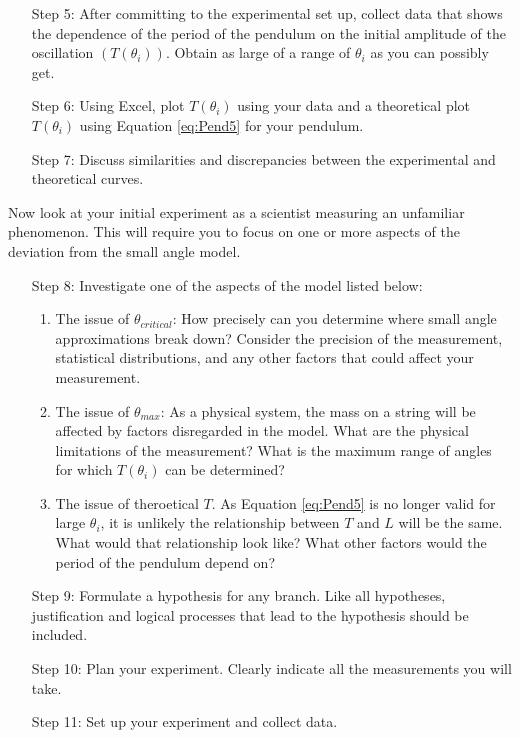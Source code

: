 \documentclass[12pt, a4paper, oneside, openright, titlepage]{book}
\begin{document}
\begin{itemize}[leftmargin = 50pt]
    \item[Step 5:] After committing to the experimental set up, collect data that shows the dependence of the period of the pendulum on the initial amplitude of the oscillation $(T(\theta_i))$. Obtain as large of a range of $\theta_i$ as you can possibly get.
    \item[Step 6:] Using Excel, plot $T(\theta_i)$ using your data and a theoretical plot $T(\theta_i)$ using Equation \ref{eq:Pend5} for your pendulum.
    \item[Step 7:] Discuss similarities and discrepancies between the experimental and theoretical curves.
\end{itemize}

Now look at your initial experiment as a scientist measuring an unfamiliar phenomenon. This will require you to focus on one or more aspects of the deviation from the small angle model. 


\begin{itemize}[leftmargin = 50pt]
    \item[Step 8:] Investigate one of the aspects of the model listed below: \begin{enumerate}
            \item The issue of $\theta_{critical}$: How precisely can you determine where small angle approximations break down? Consider the precision of the measurement, statistical distributions, and any other factors that could affect your measurement.
            \item The issue of $\theta_{max}$: As a physical system, the mass on a string will be affected by factors disregarded in the model. What are the physical limitations of the measurement? What is the maximum range of angles for which $T(\theta_i)$ can be determined?
            \item The issue of theroetical $T$. As Equation \ref{eq:Pend5} is no longer valid for large $\theta_i$, it is unlikely the relationship between $T$ and $L$ will be the same. What would that relationship look like? What other factors would the period of the pendulum depend on?
    \end{enumerate}
    \item[Step 9:] Formulate a hypothesis for any branch. Like all hypotheses, justification and logical processes that lead to the hypothesis should be included.
    \item[Step 10:] Plan your experiment. Clearly indicate all the measurements you will take.
    \item[Step 11:] Set up your experiment and collect data.
\end{itemize}
\end{document}
